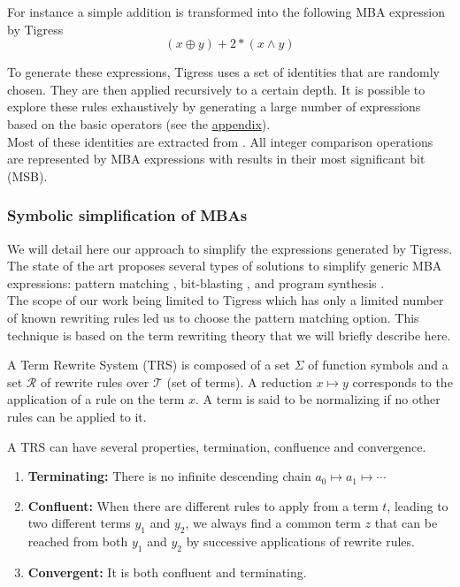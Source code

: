 \documentclass{projectreport}
\begin{document}
\begin{example}
For instance a simple addition is transformed into the following \textsf{MBA} expression by Tigress
\begin{equation}
    (x \oplus y) + 2 * (x \land y) 
\end{equation}
\end{example}

To generate these expressions, Tigress uses a set of identities that are randomly chosen. They are then applied recursively to a certain depth. It is possible to explore these rules exhaustively by generating a large number of expressions based on the basic operators (see the  \hyperref[app:rules]{appendix}). \\
Most of these identities are extracted from \cite{HackersDelight}. All integer comparison operations are represented by \textsf{MBA} expressions with results in their most significant bit (\textsf{MSB}).

\subsubsection{Symbolic simplification of MBAs}

We will detail here our approach to simplify the expressions generated by Tigress. The state of the art proposes several types of solutions to simplify generic \textsf{MBA} expressions: pattern matching \cite{eyrolles}, bit-blasting \cite{Guinet2016AryboMC}, and program synthesis \cite{syntia}. \\
The scope of our work being limited to Tigress which has only a limited number of known rewriting rules led us to choose the pattern matching option.  This technique is based on the term rewriting theory that we will briefly describe here.

\begin{definition}
A Term Rewrite System (\textsf{TRS}) \cite{termrewriting} is composed of a set $\Sigma$ of function symbols and a set $\mathcal{R}$ of rewrite rules over $\mathcal{T}$ (set of terms). A reduction $x \mapsto y$ corresponds to the application of a rule on the term $x$. A term is said to be normalizing if no other rules can be applied to it.

\end{definition}
\begin{definition}
A \textsf{TRS} can have several properties, termination, confluence and convergence.
\begin{enumerate}
    \item \textbf{Terminating: } There is no infinite descending chain $a_0 \mapsto a_1 \mapsto \cdots$
    \item \textbf{Confluent: } When there are different rules to apply from a term $t$, leading to two different terms $y_1$ and $y_2$, we always find a common term $z$ that can be reached from both $y_1$ and $y_2$ by successive applications of rewrite rules.
    \item \textbf{Convergent: } It is both confluent and terminating.
\end{enumerate}
\end{definition}
\end{document}
